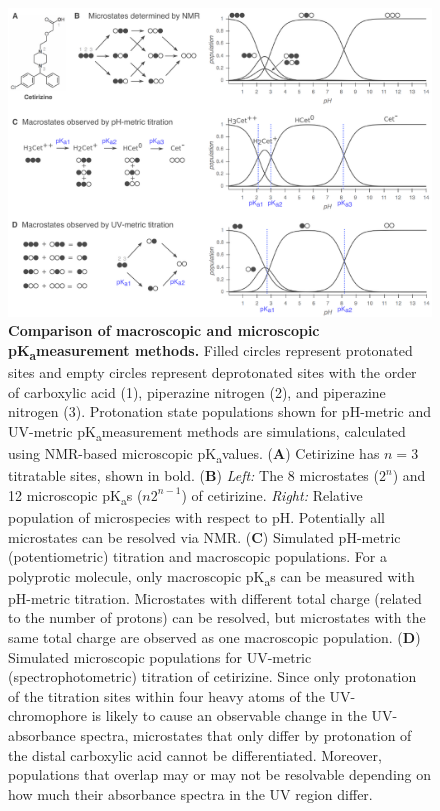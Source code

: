 \documentclass[9pt,lineno]{elife}
\newcommand{\pKa}{pK\textsubscript{a}}
\begin{document}
\begin{figure}
\begin{center}
\includegraphics[width=1.00\linewidth]{figures/microscopic_vs_macroscopic_populations_figure.pdf}
\caption{{\bf Comparison of macroscopic and microscopic \pKa measurement methods.}  
Filled circles represent protonated sites and empty circles represent deprotonated sites with the order of carboxylic acid (1), piperazine nitrogen (2), and piperazine nitrogen (3). 
Protonation state populations shown for pH-metric and UV-metric \pKa measurement methods are simulations, calculated using NMR-based microscopic \pKa values.
(\textbf{A}) Cetirizine has $n = $3 titratable sites, shown in bold. 
(\textbf{B}) \emph{Left:} The 8 microstates ($2^n$) and 12 microscopic \pKa s ($n 2^{n-1}$) of cetirizine. 
\emph{Right:} Relative population of microspecies with respect to pH. 
Potentially all microstates can be resolved via NMR. 
(\textbf{C}) Simulated pH-metric (potentiometric) titration and macroscopic populations. 
For a polyprotic molecule, only macroscopic \pKa s can be measured with pH-metric titration. 
Microstates with different total charge (related to the number of protons) can be resolved, but microstates with the same total charge are observed as one macroscopic population. 
(\textbf{D}) Simulated microscopic populations for UV-metric (spectrophotometric) titration of cetirizine. 
Since only protonation of the titration sites within four heavy atoms of the UV-chromophore is likely to cause an observable change in the UV-absorbance spectra, microstates that only differ by protonation of the distal carboxylic acid cannot be differentiated. 
Moreover, populations that overlap may or may not be resolvable depending on how much their absorbance spectra in the UV region differ. 
}
\end{center}
\end{figure}
\end{document}

